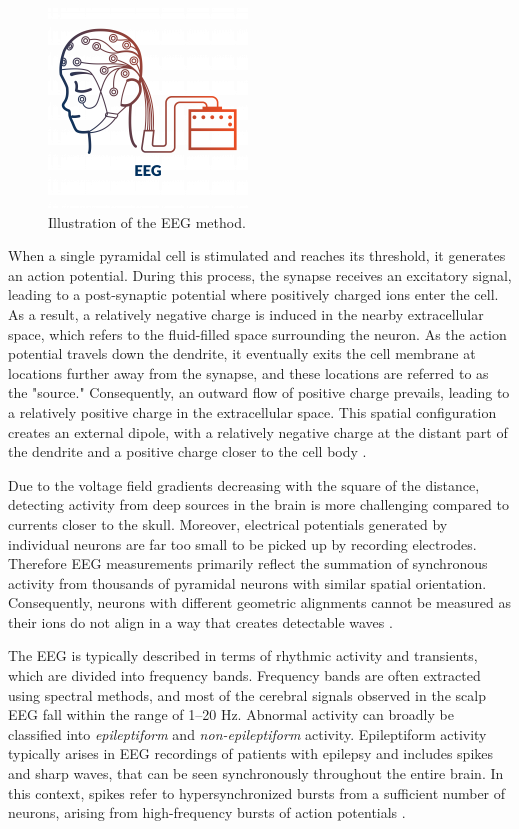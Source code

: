 \documentclass[a4paper, UKenglish, 11pt]{uiomaster}
\begin{document}
\begin{figure}[!htb]
    \centering
    \includegraphics[width=0.4\linewidth]{figures/EEG.png}
    \caption{Illustration of the EEG method. }
    \label{fig:EEG}
\end{figure}


When a single pyramidal cell is stimulated and reaches its threshold, it generates an action potential. During this process, the synapse receives an excitatory signal, leading to a post-synaptic potential where positively charged ions enter the cell. As a result, a relatively negative charge is induced in the nearby extracellular space, which refers to the fluid-filled space surrounding the neuron. As the action potential travels down the dendrite, it eventually exits the cell membrane at locations further away from the synapse, and these locations are referred to as the "source." Consequently, an outward flow of positive charge prevails, leading to a relatively positive charge in the extracellular space. This spatial configuration creates an external dipole, with a relatively negative charge at the distant part of the dendrite and a positive charge closer to the cell body \cite{bromfield2006introduction}.

Due to the voltage field gradients decreasing with the square of the distance, detecting activity from deep sources in the brain is more challenging compared to currents closer to the skull. Moreover, electrical potentials generated by individual neurons are far too small to be picked up by recording electrodes. Therefore EEG measurements primarily reflect the summation of synchronous activity from thousands of pyramidal neurons with similar spatial orientation. Consequently, neurons with different geometric alignments cannot be measured as their ions do not align in a way that creates detectable waves \cite{bromfield2006introduction}.

The EEG is typically described in terms of rhythmic activity and transients, which are divided into frequency bands. Frequency bands are often extracted using spectral methods, and most of the cerebral signals observed in the scalp EEG fall within the range of 1–20 Hz. Abnormal activity can broadly be classified into \emph{epileptiform} and \emph{non-epileptiform} activity. Epileptiform activity typically arises in EEG recordings of patients with epilepsy and includes spikes and sharp waves, that can be seen synchronously throughout the entire brain. In this context, spikes refer to hypersynchronized bursts from a sufficient number of neurons, arising from high-frequency bursts of action potentials \cite{bromfield2006introduction}.
\end{document}
